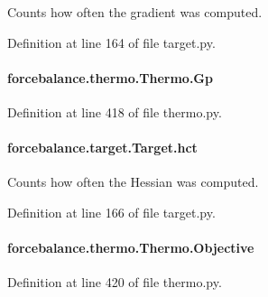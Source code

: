 Counts how often the gradient was computed. 



Definition at line 164 of file target.\-py.

\hypertarget{classforcebalance_1_1thermo_1_1Thermo_a2c052c89904a57ae487c1ff082e3f023}{
\paragraph[{Gp}]{\setlength{\rightskip}{0pt plus 5cm}forcebalance.\-thermo.\-Thermo.\-Gp}}\label{classforcebalance_1_1thermo_1_1Thermo_a2c052c89904a57ae487c1ff082e3f023}


Definition at line 418 of file thermo.\-py.

\hypertarget{classforcebalance_1_1target_1_1Target_a5b5a42f78052b47f29ed4b940c6111a1}{
\paragraph[{hct}]{\setlength{\rightskip}{0pt plus 5cm}forcebalance.\-target.\-Target.\-hct\hspace{0.3cm}{\ttfamily [inherited]}}}\label{classforcebalance_1_1target_1_1Target_a5b5a42f78052b47f29ed4b940c6111a1}


Counts how often the Hessian was computed. 



Definition at line 166 of file target.\-py.

\hypertarget{classforcebalance_1_1thermo_1_1Thermo_ad0f733fe26b94c3d7b632d7257c91e78}{
\paragraph[{Objective}]{\setlength{\rightskip}{0pt plus 5cm}forcebalance.\-thermo.\-Thermo.\-Objective}}\label{classforcebalance_1_1thermo_1_1Thermo_ad0f733fe26b94c3d7b632d7257c91e78}


Definition at line 420 of file thermo.\-py.

